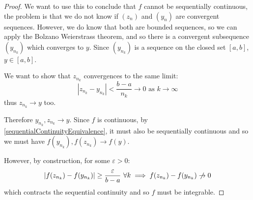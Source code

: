 \documentclass[../main.tex]{subfiles}
\begin{document}
\begin{proof}
  We want to use this to conclude that $f$ cannot be sequentially continuous, the problem is that we do not know if $(z_n)$ and $(y_n)$ are convergent sequences.
  However, we do know that both are bounded sequences, so we can apply the Bolzano Weierstrass theorem, and so there is a convergent subsequence $(y_{n_k})$ which converges to $y$.
  Since $(y_{n_k})$ is a sequence on the closed set $[a, b]$, $y \in [a, b]$.

  We want to show that $z_{n_k}$ convergences to the same limit:
  \[
    |z_{n_k} - y_{n_k}| < \frac{b - a}{n_{k}} \to 0 \text{ as } k \to \infty
  \]
  thus $z_{n_k} \to y$ too.

  Therefore $y_{n_k}, z_{n_k} \to y$.
  Since $f$ is continuous, by \cref{sequentialContinuityEquivalence}, it must also be sequentially continuous and so we must have $f(y_{n_k}), f(z_{n_k}) \to f(y)$.

  However, by construction, for some $\varepsilon > 0$:
  \[
    |f(z_{n_k}) - f(y_{n_k})| \geq \frac{\varepsilon}{b - a}\ \forall k \implies f(z_{n_k}) - f(y_{n_k}) \centernot\to 0
  \]
  which contracts the sequential continuity and so $f$ must be integrable.
\end{proof}
\end{document}
